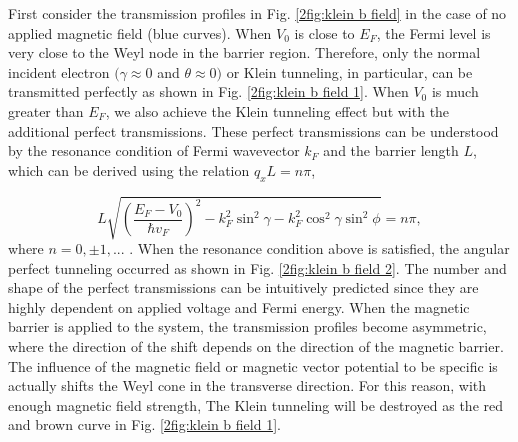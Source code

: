     First consider the transmission profiles in Fig. \ref{2fig:klein b field} in the case of no applied magnetic field (blue curves).
    When $V_0$ is close to $E_F$, the Fermi level is very close to the Weyl node in the barrier region. 
    Therefore, only the normal incident electron $(\gamma \approx 0$ and $\theta \approx 0)$ or Klein tunneling, in particular, can be transmitted perfectly as shown in Fig. \ref{2fig:klein b field 1}.
    When $V_0$ is much greater than $E_F$, we also achieve the Klein tunneling effect but with the additional perfect transmissions.
    These perfect transmissions can be understood by the resonance condition of Fermi wavevector $k_F$ and the barrier length $L$, which can be derived using the relation $q_x L = n \pi$,
    
    \begin{equation}\label{2eq:resonance condition}
        L \sqrt{\left(\frac{E_F-V_0}{\hbar v_F}\right)^2-k_F^2 \sin^2{\gamma}-k_F^2 \cos^2{\gamma} \sin^2{\phi}}= n \pi,
    \end{equation}
    where $n = 0, \pm 1,...$ . When the resonance condition above is satisfied, the angular perfect tunneling occurred as shown in Fig. \ref{2fig:klein b field 2}.
    The number and shape of the perfect transmissions can be intuitively predicted since they are highly dependent on applied voltage and Fermi energy.
    When the magnetic barrier is applied to the system, the transmission profiles become asymmetric, where the direction of the shift depends on the direction of the magnetic barrier.
    The influence of the magnetic field or magnetic vector potential to be specific is actually shifts the Weyl cone in the transverse direction.
    For this reason, with enough magnetic field strength, The Klein tunneling will be destroyed as the red and brown curve in Fig. \ref{2fig:klein b field 1}. 
